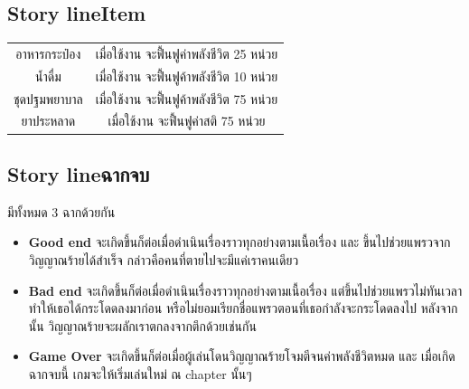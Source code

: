 \subsection{\ifenglish Story line\else Item\fi }
\begin{center}
    \begin{tabular}{|c|c|}
    \hline
    อาหารกระป๋อง & เมื่อใช้งาน จะฟื้นฟูค่าพลังชีวิต 25 หน่วย\\
    น้ำดื่ม & เมื่อใช้งาน จะฟื้นฟูค้าพลังชีวิต 10 หน่วย\\
    ชุดปฐมพยาบาล & เมื่อใช้งาน จะฟื้นฟูค้าพลังชีวิต 75 หน่วย\\
    ยาประหลาด & เมื่อใช้งาน จะฟื้นฟูค่าสติ 75 หน่วย\\
    \hline
    \end{tabular}
\end{center}
\subsection{\ifenglish Story line\else ฉากจบ\fi }
มีทั้งหมด 3 ฉากด้วยกัน
\begin{itemize}
    \item \textbf{Good end} จะเกิดขึ้นก็ต่อเมื่อดำเนินเรื่องราวทุกอย่างตามเนื้อเรื่อง และ ขึ้นไปช่วยแพรวจากวิญญาณร้ายได้สำเร็จ กล่าวคือคนที่ตายไปจะมีแค่เราคนเดียว
    \item \textbf{Bad end} จะเกิดขึ้นก็ต่อเมื่อดำเนินเรื่องราวทุกอย่างตามเนื้อเรื่อง แต่ขึ้นไปช่วยแพรวไม่ทันเวลา ทำให้เธอได้กระโดดลงมาก่อน หรือไม่ยอมเรียกชื่อแพรวตอนที่เธอกำลังจะกระโดดลงไป หลังจากนั้น วิญญาณร้ายจะผลักเราตกลงจากตึกด้วยเช่นกัน
    \item \textbf{Game Over} จะเกิดขึ้นก็ต่อเมื่อผู้เล่นโดนวิญญาณร้ายโจมตีจนค่าพลังชีวิตหมด และ เมื่อเกิดฉากจบนี้ เกมจะให้เริ่มเล่นใหม่ ณ chapter นั้นๆ
\end{itemize}


